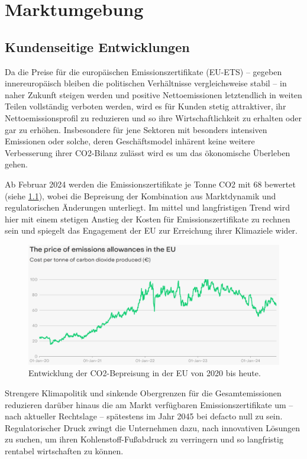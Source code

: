 \chapter{Marktumgebung}

\section{Kundenseitige Entwicklungen}

Da die Preise für die europäischen Emissionszertifikate (EU-ETS) -- gegeben innereuropäisch bleiben die politischen Verhältnisse vergleichsweise stabil -- in naher Zukunft steigen werden und positive Nettoemissionen letztendlich in weiten Teilen vollständig verboten werden, wird es für Kunden stetig attraktiver, ihr Nettoemissionsprofil zu reduzieren und so ihre Wirtschaftlichkeit zu erhalten oder gar zu erhöhen.
Insbesondere für jene Sektoren mit besonders intensiven Emissionen oder solche, deren Geschäftsmodel inhärent keine weitere Verbesserung ihrer CO2-Bilanz zulässt wird es um das ökonomische Überleben gehen.

Ab Februar 2024 werden die Emissionszertifikate je Tonne CO2 mit \qty{68}{\EUR} bewertet (siehe \cref{fig:carbon price tracker}), wobei die Bepreisung der Kombination aus Marktdynamik und regulatorischen Änderungen unterliegt.
Im mittel und langfristigen Trend wird hier mit einem stetigen Anstieg der Kosten für Emissionszertifikate zu rechnen sein und spiegelt das Engagement der EU zur Erreichung ihrer Klimaziele wider.

\begin{figure}[h]
    \centering
    \includegraphics[width=.9\textwidth]{Carbon Price Tracker_Ember.png}
    \caption[Entwicklung der CO2-Bepreisung in der EU]{Entwicklung der CO2-Bepreisung in der EU von 2020 bis heute.}\label{fig:carbon price tracker}
\end{figure}

Strengere Klimapolitik und sinkende Obergrenzen für die Gesamtemissionen reduzieren darüber hinaus die am Markt verfügbaren Emissionszertifikate um -- nach aktueller Rechtslage -- spätestens im Jahr 2045 bei defacto null zu sein.
Regulatorischer Druck zwingt die Unternehmen dazu, nach innovativen Lösungen zu suchen, um ihren Kohlenstoff-Fußabdruck zu verringern und so langfristig rentabel wirtschaften zu können.

